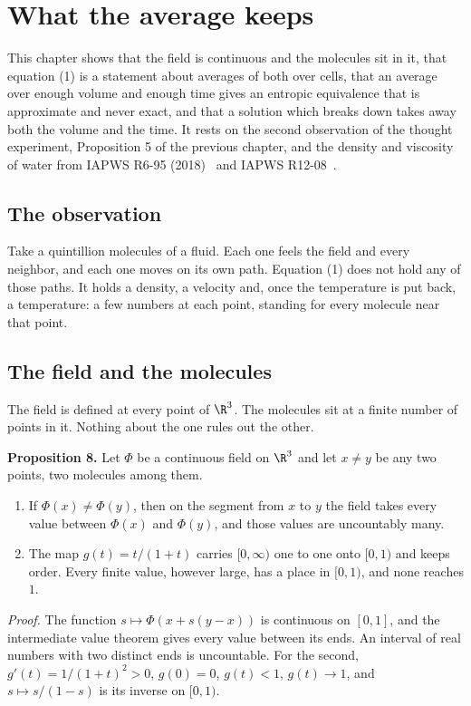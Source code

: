 \chapter{What the average keeps}

This chapter shows that the field is continuous and the molecules sit in it, that equation (1) is
a statement about averages of both over cells, that an average over enough volume and enough time
gives an entropic equivalence that is approximate and never exact, and that a solution which breaks
down takes away both the volume and the time. It rests on the second observation of the thought
experiment, Proposition 5 of the previous chapter, and the density and viscosity of water from
IAPWS R6-95 (2018)~\cite{src:IAPWS-R6-95-2018} and IAPWS R12-08~\cite{src:IAPWS-R12-08}.

\section{The observation}

Take a quintillion molecules of a fluid. Each one feels the field and every neighbor, and each one
moves on its own path. Equation (1) does not hold any of those paths. It holds a density, a
velocity and, once the temperature is put back, a temperature: a few numbers at each point,
standing for every molecule near that point.

\section{The field and the molecules}

The field is defined at every point of $\R^3$. The molecules sit at a finite number of points in it.
Nothing about the one rules out the other.

\textbf{Proposition 8.} Let $\Phi$ be a continuous field on $\R^3$ and let $x \neq y$ be any two
points, two molecules among them.
\begin{enumerate}
\item If $\Phi(x) \neq \Phi(y)$, then on the segment from $x$ to $y$ the field takes every value
between $\Phi(x)$ and $\Phi(y)$, and those values are uncountably many.
\item The map $g(t) = t/(1+t)$ carries $[0,\infty)$ one to one onto $[0,1)$ and keeps order. Every
finite value, however large, has a place in $[0,1)$, and none reaches $1$.
\end{enumerate}

\emph{Proof.} The function $s \mapsto \Phi(x + s(y-x))$ is continuous on $[0,1]$, and the
intermediate value theorem gives every value between its ends. An interval of real numbers with
two distinct ends is uncountable. For the second, $g'(t) = 1/(1+t)^2 > 0$, $g(0) = 0$, $g(t) < 1$,
$g(t) \to 1$, and $s \mapsto s/(1-s)$ is its inverse on $[0,1)$. \hfill\qedsymbol

